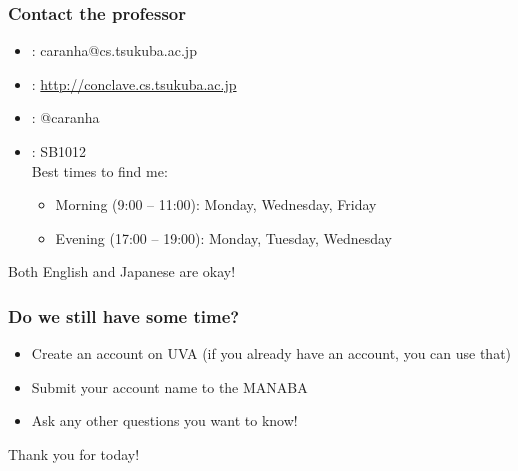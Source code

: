 \documentclass{beamer}
\begin{document}
\begin{frame}
  \frametitle{Contact the professor}
  \begin{itemize}
  \item {}: caranha@cs.tsukuba.ac.jp
  \item {}: \url{http://conclave.cs.tsukuba.ac.jp}
  \item {}: @caranha

    \bigskip

  \item {}: SB1012\\
    Best times to find me:
    \begin{itemize}
    \item Morning (9:00 -- 11:00): Monday, Wednesday, Friday
    \item Evening (17:00 -- 19:00): Monday, Tuesday, Wednesday
    \end{itemize}
  \end{itemize}

  \bigskip

  Both English and Japanese are okay!
\end{frame}



\begin{frame}
  \frametitle{Do we still have some time?}

  \begin{itemize}
  \item Create an account on UVA (if you already have an account, you can use that)

    \bigskip

  \item Submit your account name to the MANABA

    \bigskip

  \item Ask any other questions you want to know!
  \end{itemize}

  \bigskip

  \begin{center}
    Thank you for today!
  \end{center}
\end{frame}
\end{document}
